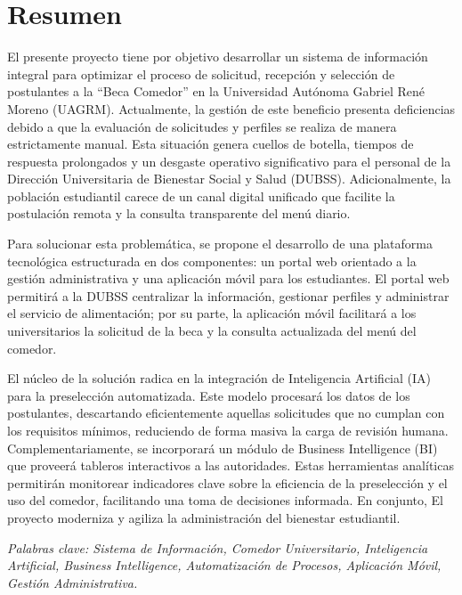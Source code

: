 
\section*{Resumen}

El presente proyecto tiene por objetivo desarrollar un sistema de información integral para optimizar el proceso de solicitud, recepción y selección de postulantes a la \enquote{Beca Comedor} en la Universidad Autónoma Gabriel René Moreno (UAGRM). Actualmente, la gestión de este beneficio presenta deficiencias debido a que la evaluación de solicitudes y perfiles se realiza de manera estrictamente manual. Esta situación genera cuellos de botella, tiempos de respuesta prolongados y un desgaste operativo significativo para el personal de la Dirección Universitaria de Bienestar Social y Salud (DUBSS). Adicionalmente, la población estudiantil carece de un canal digital unificado que facilite la postulación remota y la consulta transparente del menú diario.

Para solucionar esta problemática, se propone el desarrollo de una plataforma tecnológica estructurada en dos componentes: un portal web orientado a la gestión administrativa y una aplicación móvil para los estudiantes. El portal web permitirá a la DUBSS centralizar la información, gestionar perfiles y administrar el servicio de alimentación; por su parte, la aplicación móvil facilitará a los universitarios la solicitud de la beca y la consulta actualizada del menú del comedor.

El núcleo de la solución radica en la integración de Inteligencia Artificial (IA) para la preselección automatizada. Este modelo procesará los datos de los postulantes, descartando eficientemente aquellas solicitudes que no cumplan con los requisitos mínimos, reduciendo de forma masiva la carga de revisión humana. Complementariamente, se incorporará un módulo de Business Intelligence (BI) que proveerá tableros interactivos a las autoridades. Estas herramientas analíticas permitirán monitorear indicadores clave sobre la eficiencia de la preselección y el uso del comedor, facilitando una toma de decisiones informada. En conjunto, El proyecto moderniza y agiliza la administración del bienestar estudiantil.

\indent\textit{Palabras clave: Sistema de Información, Comedor Universitario, Inteligencia Artificial, Business Intelligence, Automatización de Procesos, Aplicación Móvil, Gestión Administrativa.}